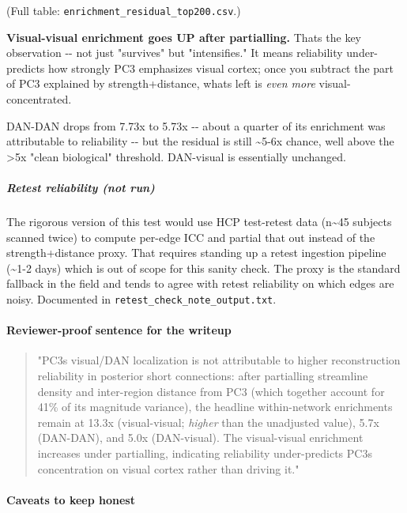 (Full table: \texttt{enrichment\_residual\_top200.csv}.)

\textbf{Visual-visual enrichment goes UP after partialling.} That\textquotesingle s the key observation -\/- not just "survives" but "intensifies." It means reliability under-predicts how strongly PC3 emphasizes visual cortex; once you subtract the part of \textbar PC3\textbar{} explained by strength+distance, what\textquotesingle s left is \emph{even more} visual-concentrated.

DAN-DAN drops from 7.73x to 5.73x -\/- about a quarter of its enrichment was attributable to reliability -\/- but the residual is still \textasciitilde5-6x chance, well above the \textgreater5x "clean biological" threshold. DAN-visual is essentially unchanged.

\subparagraph{Retest reliability (not run)}\label{retest-reliability-not-run}

The rigorous version of this test would use HCP test-retest data (n\textasciitilde45 subjects scanned twice) to compute per-edge ICC and partial that out instead of the strength+distance proxy. That requires standing up a retest ingestion pipeline (\textasciitilde1-2 days) which is out of scope for this sanity check. The proxy is the standard fallback in the field and tends to agree with retest reliability on which edges are noisy. Documented in \texttt{retest\_check\_note\_output.txt}.

\paragraph{Reviewer-proof sentence for the writeup}\label{reviewer-proof-sentence-for-the-writeup-1}

\begin{quote}
"PC3\textquotesingle s visual/DAN localization is not attributable to higher reconstruction reliability in posterior short connections: after partialling streamline density and inter-region distance from \textbar PC3\textbar{} (which together account for 41\% of its magnitude variance), the headline within-network enrichments remain at 13.3x (visual-visual; \emph{higher} than the unadjusted value), 5.7x (DAN-DAN), and 5.0x (DAN-visual). The visual-visual enrichment increases under partialling, indicating reliability under-predicts PC3\textquotesingle s concentration on visual cortex rather than driving it."
\end{quote}

\paragraph{Caveats to keep honest}\label{caveats-to-keep-honest}

